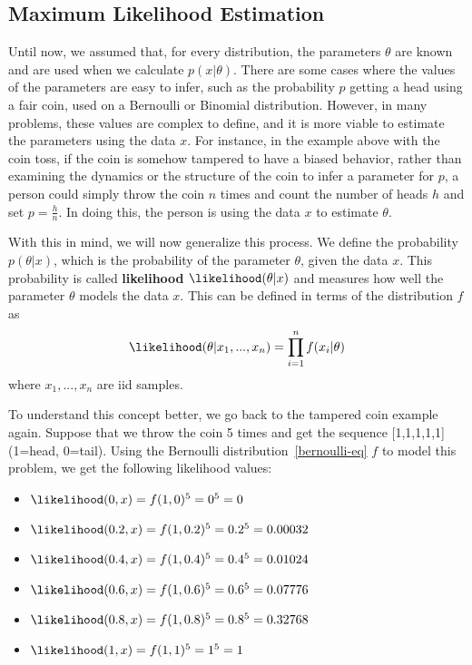 \subsection{Maximum Likelihood Estimation}
Until now, we assumed that, for every distribution, the parameters $\theta$ are known and are used when we calculate $p(x|\theta)$.
There are some cases where the values of the parameters are easy to infer, such as the probability $p$ getting a head using a fair coin, used on a Bernoulli or Binomial distribution.
However, in many problems, these values are complex to define, and it is more viable to estimate the parameters using the data $x$. 
For instance, in the example above with the coin toss, if the coin is somehow tampered to have a biased behavior, 
rather than examining the dynamics or the structure of the coin to infer a parameter for $p$, 
a person could simply throw the coin $n$ times and count the number of heads $h$ and set $p=\frac{h}{n}$. In doing this, the person is using the data $x$ to estimate $\theta$.

With this in mind, we will now generalize this process. We define the probability $p(\theta|x)$, which is the probability of the parameter $\theta$, given the data $x$. 
This probability is called {\bf likelihood} $\likelihood(\theta|x)$ and measures how well the parameter $\theta$ models the data $x$. This can be defined in terms of the distribution $f$ as
\begin{equation*}
\likelihood(\theta|x_1,...,x_n)=\prod_{i=1}^n f(x_i|\theta)
\end{equation*}
where $x_1,...,x_n$ are iid samples.

To understand this concept better, we go back to the tampered coin example again. Suppose that we throw the coin 5 times and get the sequence [1,1,1,1,1] (1=head, 0=tail). 
Using the Bernoulli distribution~\ref{bernoulli-eq} $f$ to model this problem, we get the following likelihood values:
\begin{itemize}
\item $\likelihood(0,x) = f(1,0)^5 = 0^5 = 0$
\item $\likelihood(0.2,x) = f(1,0.2)^5 = 0.2^5 = 0.00032$
\item $\likelihood(0.4,x) = f(1,0.4)^5 = 0.4^5 = 0.01024$
\item $\likelihood(0.6,x) = f(1,0.6)^5 = 0.6^5 = 0.07776$
\item $\likelihood(0.8,x) = f(1,0.8)^5 = 0.8^5 = 0.32768$
\item $\likelihood(1,x) = f(1,1)^5 = 1^5 = 1$
\end{itemize}

